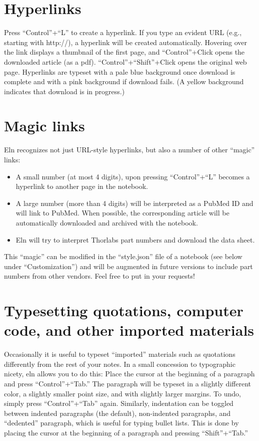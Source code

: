 \documentclass[11pt]{report}
\begin{document}
\section{Hyperlinks}

Press ``Control''+``L'' to create a hyperlink. If you
type an evident URL (e.g., starting with http://), a hyperlink will be
created automatically. Hovering over the link displays a
thumbnail of the first page, and ``Control''+Click opens the
downloaded article (as a pdf). ``Control''+``Shift''+Click opens the
original web page. Hyperlinks are typeset with a pale blue background
once download is complete and with a pink background if download
fails. (A yellow background indicates that download is in progress.)

\section{Magic links}

Eln recognizes not just URL-style hyperlinks, but also a number of
other ``magic'' links:
\begin{itemize}
\item A small number (at most 4 digits), upon pressing ``Control''+``L''
becomes a hyperlink to another page in the notebook.
\item A large number (more than 4 digits)
will be interpreted as a PubMed ID and will link to PubMed. When
possible, the corresponding article will be automatically downloaded
and archived with the notebook. 
\item Eln will try to interpret Thorlabs part numbers and
  download the data sheet.
\end{itemize}
This ``magic'' can be modified in the ``style.json'' file of a
notebook (see below under ``Customization'') and will be augmented in
future versions to include part numbers from other vendors. Feel free
to put in your requests!

\section{Typesetting quotations, computer code, and other imported materials}

Occasionally it is useful to typeset ``imported'' materials such as
quotations differently from the rest of your notes. In a small
concession to typographic nicety, eln allows you to do this: Place
the cursor at
the beginning of a paragraph and press ``Control''+``Tab.'' The
paragraph will be typeset in a slightly different color, a slightly
smaller point size, and with slightly larger margins. To undo, simply
press ``Control''+``Tab'' again. Similarly, indentation can be
toggled between indented paragraphs (the default), non-indented
paragraphs, and ``dedented'' paragraph, which is useful for typing
bullet lists. This is done by placing the cursor at the beginning of a
paragraph and pressing ``Shift''+``Tab.''
\end{document}
